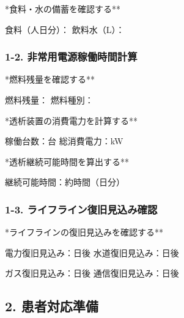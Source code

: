 \documentclass[
  japanese,
  letterpaper,
  DIV=11,
  numbers=noendperiod]{scrartcl}
\begin{document}
\vspace{3mm}

\checkbox **食料・水の備蓄を確認する**

\quad 食料（人日分）：\underlinespace{3cm}
\quad 飲料水（L）：\underlinespace{3cm}

\vspace{5mm}

\subsubsection{1-2.
非常用電源稼働時間計算}\label{ux975eux5e38ux7528ux96fbux6e90ux7a3cux50cdux6642ux9593ux8a08ux7b97}

\checkbox **燃料残量を確認する**

\quad 燃料残量：\underlinespace{4cm}
\quad 燃料種別：\underlinespace{4cm}

\vspace{3mm}

\checkbox **透析装置の消費電力を計算する**

\quad 稼働台数：\underlinespace{2cm}台
\quad 総消費電力：\underlinespace{4cm}kW

\vspace{3mm}

\checkbox **透析継続可能時間を算出する**

\quad 継続可能時間：約\underlinespace{3cm}時間（\underlinespace{2cm}日分）

\newpage

\subsubsection{1-3.
ライフライン復旧見込み確認}\label{ux30e9ux30a4ux30d5ux30e9ux30a4ux30f3ux5fa9ux65e7ux898bux8fbcux307fux78baux8a8d}

\checkbox **ライフラインの復旧見込みを確認する**

\quad 電力復旧見込み：\underlinespace{2cm}日後
\quad 水道復旧見込み：\underlinespace{2cm}日後

\quad ガス復旧見込み：\underlinespace{2cm}日後
\quad 通信復旧見込み：\underlinespace{2cm}日後

\vspace{10mm}

\subsection{2. 患者対応準備}\label{ux60a3ux8005ux5bfeux5fdcux6e96ux5099}
\end{document}
